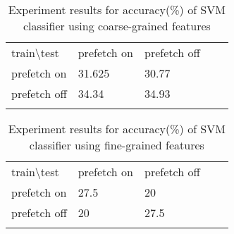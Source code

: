 \begin{table}[]
\centering
\caption{Experiment results for accuracy(\%) of SVM classifier using coarse-grained features}
\label{table:rq1-svm}
\begin{tabular}{lllll}
\cline{1-3}
\multicolumn{1}{|l|}{train\textbackslash test} & \multicolumn{1}{l|}{prefetch on} & \multicolumn{1}{l|}{prefetch off} &  &  \\ \cline{1-3}
\multicolumn{1}{|l|}{prefetch on}                    & \multicolumn{1}{l|}{31.625}         & \multicolumn{1}{l|}{30.77}          &  &  \\ \cline{1-3}
\multicolumn{1}{|l|}{prefetch off}                   & \multicolumn{1}{l|}{34.34}         & \multicolumn{1}{l|}{34.93}          &  &  \\ \cline{1-3}
                                                     &                                  &                                   &  & 
\end{tabular}                  
\end{table}

\begin{table}[]
\centering
\caption{Experiment results for accuracy(\%) of SVM classifier using fine-grained features}
\label{table:rq1-svm-strdist}
\begin{tabular}{lllll}
\cline{1-3}
\multicolumn{1}{|l|}{train\textbackslash test} & \multicolumn{1}{l|}{prefetch on} & \multicolumn{1}{l|}{prefetch off} &  &  \\ \cline{1-3}
\multicolumn{1}{|l|}{prefetch on}                    & \multicolumn{1}{l|}{27.5}         & \multicolumn{1}{l|}{20}          &  &  \\ \cline{1-3}
\multicolumn{1}{|l|}{prefetch off}                   & \multicolumn{1}{l|}{20}         & \multicolumn{1}{l|}{27.5}          &  &  \\ \cline{1-3}
                                                     &                                  &                                   &  & 
\end{tabular}                  
\end{table}

